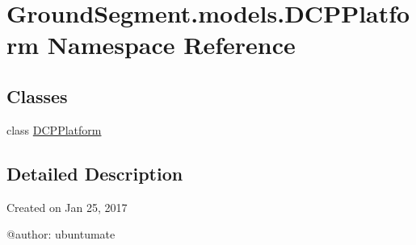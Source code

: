 \hypertarget{namespace_ground_segment_1_1models_1_1_d_c_p_platform}{}\section{Ground\+Segment.\+models.\+D\+C\+P\+Platform Namespace Reference}
\label{namespace_ground_segment_1_1models_1_1_d_c_p_platform}
\subsection*{Classes}
\begin{DoxyCompactItemize}
\item 
class \hyperlink{class_ground_segment_1_1models_1_1_d_c_p_platform_1_1_d_c_p_platform}{D\+C\+P\+Platform}
\end{DoxyCompactItemize}


\subsection{Detailed Description}
\begin{DoxyVerb}Created on Jan 25, 2017

@author: ubuntumate
\end{DoxyVerb}
 